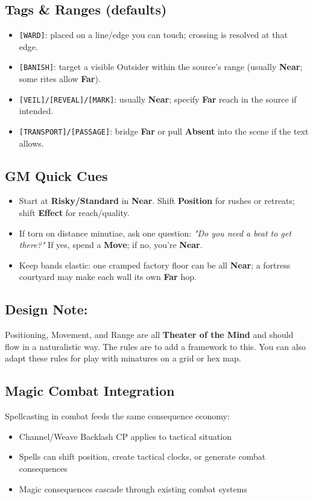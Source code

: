 \documentclass[11pt]{article}
\begin{document}
\subsection*{Tags \& Ranges (defaults)}
\begin{itemize}
  \item \texttt{[WARD]}: placed on a line/edge you can touch; crossing is resolved at that edge.
  \item \texttt{[BANISH]}: target a visible Outsider within the source's range (usually \textbf{Near}; some rites allow \textbf{Far}).
  \item \texttt{[VEIL]/[REVEAL]/[MARK]}: usually \textbf{Near}; specify \textbf{Far} reach in the source if intended.
  \item \texttt{[TRANSPORT]/[PASSAGE]}: bridge \textbf{Far} or pull \textbf{Absent} into the scene if the text allows.
\end{itemize}

\subsection*{GM Quick Cues}
\begin{itemize}
  \item Start at \textbf{Risky/Standard} in \textbf{Near}. Shift \textbf{Position} for rushes or retreats; shift \textbf{Effect} for reach/quality.
  \item If torn on distance minutiae, ask one question: \emph{"Do you need a beat to get there?"} If yes, spend a \textbf{Move}; if no, you're \textbf{Near}.
  \item Keep bands elastic: one cramped factory floor can be all \textbf{Near}; a fortress courtyard may make each wall its own \textbf{Far} hop.
\end{itemize}

\subsection{Design Note:} Positioning, Movement, and Range are all \textbf{Theater of the Mind} and should flow in a naturalistic way. The rules are to add a framework to this. You can also adapt these rules for play with minatures on a grid or hex map. 

\subsection{Magic Combat Integration}
Spellcasting in combat feeds the same consequence economy:
\begin{itemize}
    \item Channel/Weave Backlash CP applies to tactical situation
    \item Spells can shift position, create tactical clocks, or generate combat consequences
    \item Magic consequences cascade through existing combat systems
\end{itemize}
\end{document}

